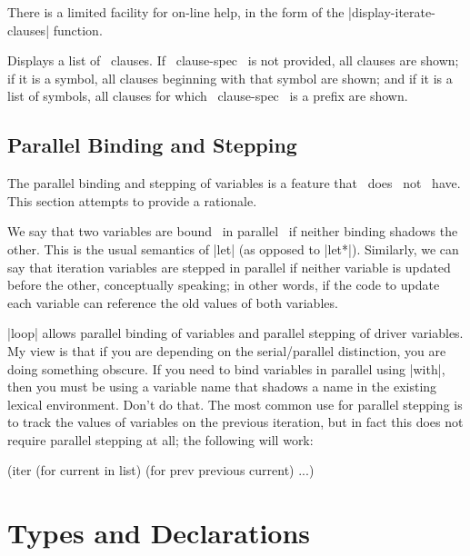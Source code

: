 \begin{sloppypar}
There is a limited facility for on-line help, in the form of the 
|display-iterate-clauses| function.
\end{sloppypar}

\begin{clauses}

Displays a list of \iter\ clauses.  If ~clause-spec~ is not
provided, all clauses are shown; if it is a symbol, all clauses
beginning with that symbol are shown; and if it is a list of symbols,
all clauses for which ~clause-spec~ is a prefix are shown.

\end{clauses}

\subsection{Parallel Binding and Stepping}
\label{bindings}

The parallel binding and stepping of variables is a feature that
\iter\ does ~not~ have.  This section attempts to provide a rationale.

We say that two variables are bound ~in parallel~ if neither
binding shadows the other.  This is the usual semantics of |let|
(as opposed to |let*|).  Similarly, we can say that iteration
variables are stepped in parallel if neither variable is updated
before the other, conceptually speaking; in other words, if the code
to update each variable can reference the old values of both variables.

|loop| allows parallel binding of variables and parallel stepping of
driver variables.  My view is that if you are depending on the 
serial/parallel distinction, you are doing something obscure.  If you
need to bind 
variables in parallel using |with|, then you must be using a
variable name that shadows a name in the existing lexical environment.
Don't do that.  The most common use for parallel stepping is to track
the values of variables on the previous iteration, but in fact this
does not require parallel stepping at all; the following will work:
\begin{program}
(iter (for current in list)
      (for prev previous current)
      ...)
\end{program}


\section{Types and Declarations}
\label{types}


